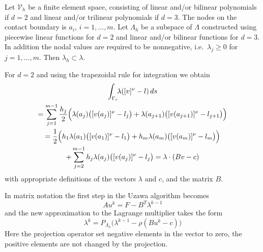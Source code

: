 \documentclass[12pt,a4paper]{article}
\numberwithin{equation}{section}
\numberwithin{table}{section}
\numberwithin{figure}{section}
\newcommand{\V}{\ensuremath{\mathcal{V}}}
\newcommand{\intG}[1][0]{\int_{\Gamma_{#1}}\!\!}
\newcommand{\intGc}{\intG[c]}
\newcommand{\ds}{{\,ds}}
\begin{document}
Let $\V_h$ be a finite element space, consisting of linear and/or bilinear polynomials if
$d=2$ and linear and/or trilinear polynomials if $d=3$.  The nodes on the contact boundary
is $a_i$, $i=1,\ldots,m$.  Let $\Lambda_h$ be a subspace of $\Lambda$ constructed using
piecewise linear functions for $d=2$ and linear and/or bilinear functions for $d=3$.  In
addition the nodal values are required to be nonnegative, i.e.~$\lambda_j\ge 0$ for
$j=1,\ldots,m$. Then $\lambda_h\subset \lambda$.

For $d=2$ and using the trapezoidal rule for integration we obtain
\begin{multline}
  \intGc \lambda([v]^\nu-l) \ds \\
  = \sum_{j=1}^{m-1} \frac{h_j}{2}\Bigl(\lambda(a_j)\bigl([v(a_j)]^\nu-l_j\bigr)
  + \lambda(a_{j+1})\bigl([v(a_{j+1})]^\nu-l_{j+1}\bigr)\Bigr) \\
  = \frac{1}{2} \Bigl( h_1\lambda(a_1)\bigl([v(a_1)]^\nu - l_1 \bigr)
  +  h_m\lambda(a_m)\bigl([v(a_m)]^\nu - l_m \bigr) \Bigr) \\
  + \sum_{j=2}^{m-1} h_j \lambda(a_j)\bigl([v(a_j)]^\nu-l_j\bigr)
  = \lambda\cdot(Bv - c)
\end{multline}
with appropriate definitions of the vectors $\lambda$ and $c$, and the matrix $B$.

In matrix notation the first step in the Uzawa algorithm becomes
\begin{equation}
  A u^k = F - B^T \lambda^{k-1}
\end{equation}
and the new approximation to the Lagrange multiplier takes the form
\begin{equation}
  \lambda^k = P_{\Lambda_h}\bigl(\lambda^{k-1} - \rho(B u^k -c)\bigr) 
\end{equation}
Here the projection operator set negative elements in the vector to zero, the positive
elements are not changed by the projection.
\end{document}
